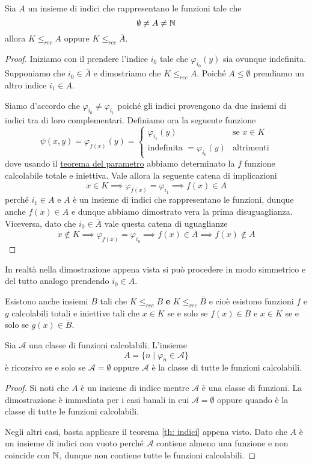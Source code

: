 \begin{theorem} \label{th: indici}
	Sia $A$ un insieme di indici che rappresentano le funzioni
	tale che
	\[ \emptyset \neq A \neq \mathbb{N} \]
	allora $K \leq_{rec} A$ oppure $K \leq_{rec} \overline{A}$.
	\begin{proof}
		Iniziamo con il prendere l'indice $i_0$ tale che
		$\varphi_{i_0}(y)$ sia ovunque indefinita. Supponiamo
		che $i_0 \in \overline{A}$ e dimostriamo che
		$K \leq_{rec} A$. Poiché $A \leq \emptyset$ prendiamo un
		altro indice $i_1 \in A$.

		Siamo d'accordo che $\varphi_{i_0} \neq \varphi_{i_1}$
		poiché gli indici provengono da due insiemi di indici
		tra di loro complementari. Definiamo ora la seguente
		funzione
		\[
			\psi (x, y) = \varphi_{f(x)} (y) = \begin{cases}
				\varphi_{i_1} (y)                      & \text{se } x \in K \\
				\text{indefinita } = \varphi_{i_0} (y) & \text{altrimenti}
			\end{cases}
		\]
		dove usando il \hyperref[th: s-m-n]{teorema del parametro}
		abbiamo determinato la $f$ funzione calcolabile totale e
		iniettiva. Vale allora la seguente catena di implicazioni
		\[
			x \in K \implies \varphi_{f(x)} = \varphi_{i_1}
			\implies f(x) \in A
		\]
		perché $i_1 \in A$ e $A$ è un insieme di indici che
		rappresentano le funzioni, dunque anche $f(x) \in A$ e
		dunque abbiamo dimostrato vera la prima disuguaglianza.
		Viceversa, dato che $i_0 \in \overline{A}$ vale questa
		catena di uguaglianze
		\[
			x \notin K \implies \varphi_{f(x)} = \varphi_{i_0}
			\implies f(x) \in \overline{A} \implies f(x) \notin A
		\]
	\end{proof}
\end{theorem}

In realtà nella dimostrazione appena vista si può procedere in
modo simmetrico e del tutto analogo prendendo $i_0 \in A$.

Esistono anche insiemi $B$ tali che $K \leq_{rec} B$ \textbf{e}
$K \leq_{rec} \overline{B}$ e cioè esistono funzioni $f$ e $g$
calcolabili totali e iniettive tali che $x \in K$ se e solo se
$f(x) \in B$ e $x \in K$ se e solo se $g(x) \in \overline{B}$.

\begin{theorem} [Rice] \label{th: rice}
	Sia $\mathcal{A}$ una classe di funzioni calcolabili.
	L'insieme
	\[ A = \{ n \mid \varphi_n \in \mathcal{A} \} \]
	è ricorsivo se e solo se $\mathcal{A} = \emptyset$ oppure
	$\mathcal{A}$ è la classe di tutte le funzioni calcolabili.
	\begin{proof}
		Si noti che $A$ è un insieme di indice mentre
		$\mathcal{A}$ è una classe di funzioni. La dimostrazione
		è immediata per i casi banali in cui
		$\mathcal{A} = \emptyset$ oppure quando è la classe di
		tutte le funzioni calcolabili.

		Negli altri casi, basta applicare il teorema
		\ref{th: indici} appena visto. Dato che $A$ è un insieme
		di indici non vuoto perché $\mathcal{A}$ contiene almeno
		una funzione e non coincide con $\mathbb{N}$, dunque non contiene
		tutte le funzioni calcolabili.
	\end{proof}
\end{theorem}

